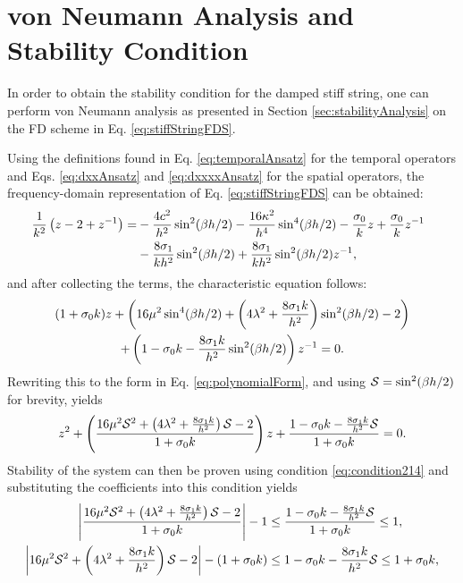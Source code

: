 {\section{von Neumann Analysis and Stability Condition}\label{sec:stiffStringStability}
In order to obtain the stability condition for the damped stiff string, one can perform von Neumann analysis as presented in Section \ref{sec:stabilityAnalysis} on the FD scheme in Eq. \eqref{eq:stiffStringFDS}.

Using the definitions found in Eq. \eqref{eq:temporalAnsatz} for the temporal operators and Eqs. \eqref{eq:dxxAnsatz} and \eqref{eq:dxxxxAnsatz} for the spatial operators, the frequency-domain representation of Eq. \eqref{eq:stiffStringFDS} can be obtained:
\begin{align*}
    \!\!\!\!\frac{1}{k^2}\left(z - 2 + z^{-1}\right) =&-\frac{4c^2}{h^2}\sin^2(\beta h/2) - \frac{16\kappa^2}{h^4}\sin^4(\beta h/2) - \frac{\sz}{k}z + \frac{\sz}{k}z^{-1}\\
    & - \frac{8 \so}{kh^2}\sin^2(\beta h/2) + \frac{8 \so}{kh^2} \sin^2(\beta h/2)z^{-1},
\end{align*}
and after collecting the terms, the characteristic equation follows:
\begin{gather}
    (1+\sz k)z + \left(16\mu^2\sin^4(\beta h/2)+\left(4\lambda^2+\frac{8\so k}{h^2}\right)\sin^2(\beta h/2) - 2\right)\nonumber\\
    +\left(1-\sz k-\frac{8\so k}{h^2}\sin^2(\beta h/2)\right)z^{-1}=0.\label{eq:charDampedString}
\end{gather}
Rewriting this to the form in Eq. \eqref{eq:polynomialForm}, and using $\S = \sin^2(\beta h /2)$ for brevity, yields
\begin{equation*}
    z^2 + \left(\frac{16\mu^2\S^2+\left(4\lambda^2+\frac{8\so k}{h^2}\right)\S - 2}{1 + \sz k}\right)z+\frac{1-\sz k-\frac{8\so k}{h^2}\S}{1 + \sz k}=0.
\end{equation*}
Stability of the system can then be proven using condition \eqref{eq:condition214} and substituting the coefficients into this condition yields
\begin{equation}\nonumber
    \begin{aligned}
        \left|\frac{16\mu^2\S^2+\left(4\lambda^2+\frac{8\so k}{h^2}\right)\S - 2}{1+\sz k}\right|-1 &\leq \frac{1-\sz k-\frac{8\so k}{h^2}\S}{1+\sz k}\leq 1,\\
        \left|16\mu^2\S^2+\left(4\lambda^2+\frac{8\so k}{h^2}\right)\S - 2\right|-(1+\sz k) &\leq 1-\sz k-\frac{8\so k}{h^2}\S\leq 1+\sz k,\\

\end{aligned}
\end{equation}}
